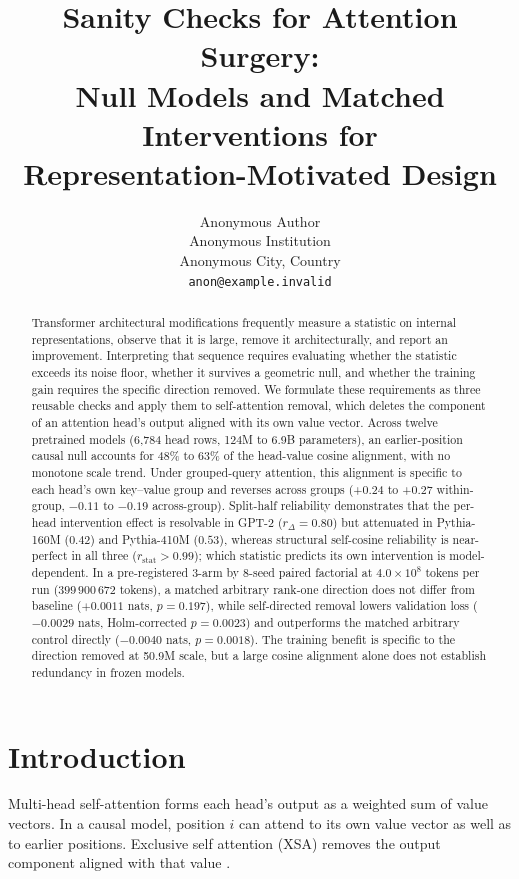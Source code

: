 \documentclass{article} %
\title{Sanity Checks for Attention Surgery: \\
Null Models and Matched Interventions for \\
Representation-Motivated Design}
\author{Anonymous Author \\
Anonymous Institution \\
Anonymous City, Country \\
\texttt{anon@example.invalid}
}
\begin{document}
\maketitle

\begin{abstract}
Transformer architectural modifications frequently measure a statistic on internal representations, observe that it is large, remove it architecturally, and report an improvement. Interpreting that sequence requires evaluating whether the statistic exceeds its noise floor, whether it survives a geometric null, and whether the training gain requires the specific direction removed. We formulate these requirements as three reusable checks and apply them to self-attention removal, which deletes the component of an attention head's output aligned with its own value vector. Across twelve pretrained models (6,784 head rows, 124M to 6.9B parameters), an earlier-position causal null accounts for 48\% to 63\% of the head-value cosine alignment, with no monotone scale trend. Under grouped-query attention, this alignment is specific to each head's own key--value group and reverses across groups (+0.24 to +0.27 within-group, $-0.11$ to $-0.19$ across-group). Split-half reliability demonstrates that the per-head intervention effect is resolvable in GPT-2 ($r_\Delta = 0.80$) but attenuated in Pythia-160M ($0.42$) and Pythia-410M ($0.53$), whereas structural self-cosine reliability is near-perfect in all three ($r_{\text{stat}} > 0.99$); which statistic predicts its own intervention is model-dependent. In a pre-registered 3-arm by 8-seed paired factorial at $4.0\times10^{8}$ tokens per run ($399\,900\,672$ tokens), a matched arbitrary rank-one direction does not differ from baseline ($+0.0011$ nats, $p = 0.197$), while self-directed removal lowers validation loss ($-0.0029$ nats, Holm-corrected $p = 0.0023$) and outperforms the matched arbitrary control directly ($-0.0040$ nats, $p = 0.0018$). The training benefit is specific to the direction removed at 50.9M scale, but a large cosine alignment alone does not establish redundancy in frozen models.
\end{abstract}

\section{Introduction}

Multi-head self-attention \citep{vaswani2017attention} forms each head's
output as a weighted sum of value vectors. In a causal model, position $i$
can attend to its own value vector as well as to earlier positions. Exclusive
self attention (XSA) removes the output component aligned with that value
\citep{zhai2026xsa}.
\end{document}
